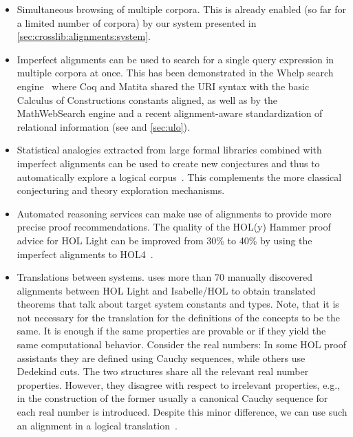 \begin{itemize}
\item Simultaneous browsing of multiple corpora. This is already enabled (so far for a limited
  number of corpora) by our system presented in \autoref{sec:crosslib:alignments:system}.
\item Imperfect alignments can be used to search for a single
  query expression in multiple corpora at once. This has been demonstrated in the Whelp
  search engine~\cite{AspertiGCTZ04} where Coq and Matita shared the URI syntax with the
  basic Calculus of Constructions constants aligned, as well as by the MathWebSearch engine
  \cite{KR:hollight:14} and a recent alignment-aware standardization of relational information (see \cite{ConKohMue:rdaml19} and \autoref{sec:ulo}).
\item Statistical analogies
extracted from large formal libraries combined with imperfect alignments can be used to
create new conjectures and thus to automatically explore a logical corpus~\cite{tgckju16cicmwip}.
This complements the more classical conjecturing and theory exploration mechanisms. %
\item Automated reasoning services can make use of alignments to provide more precise
  proof recommendations. The quality of the HOL(y) Hammer proof advice for HOL Light
  can be improved from 30\% to 40\%
  by using the imperfect alignments to HOL4~\cite{tgck-lpar15}.
\item Translations between systems.
  \cite{ckak-itp13} uses more than 70 manually discovered alignments between HOL Light and Isabelle/HOL to obtain translated theorems that talk about target system constants and types.
  Note, that it is not necessary for the translation for the definitions of the concepts to be
  the same. It is enough if the same properties are provable or if they yield the same computational
  behavior. 
  Consider the real numbers: In some HOL proof assistants they are defined using Cauchy sequences,
  while others use Dedekind cuts. The two structures share all the relevant real number
  properties. However, they disagree with respect to irrelevant properties, e.g., in the
  construction of the former usually a canonical Cauchy sequence for each real number is
  introduced. Despite this minor difference, we can use such an alignment in a logical
  translation~\cite{ckak-itp13}.
  

\end{itemize}

